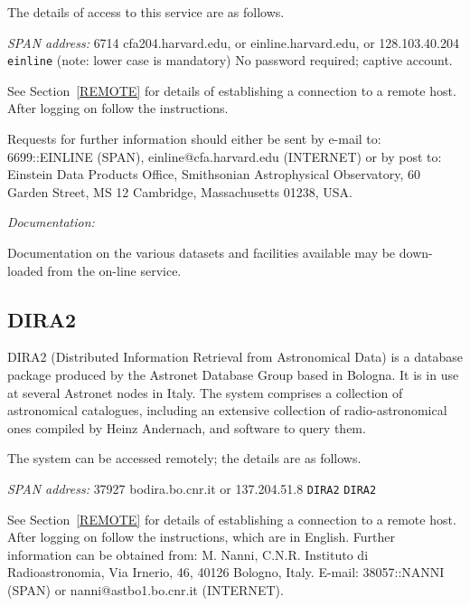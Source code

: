 \documentclass[twoside,11pt]{article}
\newcommand{\xlabel}[1]{}
\begin{document}
The details of access to this service are as follows.

{\it SPAN address: } 6714
 cfa204.harvard.edu, or
einline.harvard.edu, or 128.103.40.204
 \verb-einline- (note: lower case is mandatory)
 No password required; captive account.

See Section~\ref{REMOTE} for details of establishing a connection to
a remote host. After logging on follow the instructions.

Requests for further information should either be sent by e-mail to:
6699::EINLINE (SPAN), einline@cfa.harvard.edu (INTERNET) or by post to:
Einstein Data Products Office, Smithsonian Astrophysical Observatory,
60 Garden Street, MS 12 Cambridge, Massachusetts 01238, USA.

{\it Documentation:}

Documentation on the various datasets and facilities available may be
down-loaded from the on-line service.

\subsection{DIRA2\xlabel{dira2}}

DIRA2 (Distributed Information Retrieval from Astronomical Data) is a
database package produced by the Astronet Database Group based in
Bologna. It is in use at several Astronet nodes in Italy. The system
comprises a collection of astronomical catalogues, including an
extensive collection of radio-astronomical ones compiled by Heinz
Andernach, and software to query
them.

The system can be accessed remotely; the details are as follows.

{\it SPAN address: } 37927
 bodira.bo.cnr.it or 137.204.51.8
 \verb-DIRA2-
 \verb-DIRA2-

See Section~\ref{REMOTE} for details of establishing a connection to
a remote host. After logging on follow the instructions, which are in
English. Further information can be obtained from: M. Nanni, C.N.R.
Instituto di Radioastronomia, Via Irnerio, 46, 40126 Bologno, Italy.
E-mail: 38057::NANNI (SPAN) or nanni@astbo1.bo.cnr.it (INTERNET).
\end{document}
